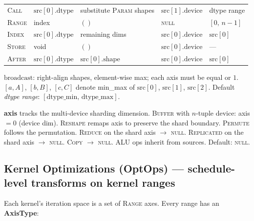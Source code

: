 \documentclass[10pt,letterpaper]{article}
\newcommand{\op}[1]{\textsc{#1}}
\begin{document}
\begin{tabular}{@{}l l l l l@{}}
\op{Call} & $\mathrm{src}[0].\mathrm{dtype}$ & substitute \op{Param} shapes & $\mathrm{src}[1].\mathrm{device}$ & dtype range \\
\op{Range} & index & $()$ & \textsc{null} & $[0,\, n{-}1]$ \\
\op{Index} & $\mathrm{src}[0].\mathrm{dtype}$ & remaining dims & $\mathrm{src}[0].\mathrm{device}$ & $\mathrm{src}[0]$ \\
\op{Store} & void & $()$ & $\mathrm{src}[0].\mathrm{device}$ & --- \\
\op{After} & $\mathrm{src}[0].\mathrm{dtype}$ & $\mathrm{src}[0].\mathrm{shape}$ & $\mathrm{src}[0].\mathrm{device}$ & $\mathrm{src}[0]$ \\
\bottomrule
\end{tabular}

\smallskip
$\mathrm{broadcast}$: right-align shapes, element-wise max; each axis must be equal or $1$.
$[a,A]$, $[b,B]$, $[c,C]$ denote min\_max of $\mathrm{src}[0]$, $\mathrm{src}[1]$, $\mathrm{src}[2]$.
Default \emph{dtype range}: $[\mathrm{dtype\_min},\, \mathrm{dtype\_max}]$.

\medskip
\textbf{axis} tracks the multi-device sharding dimension. \op{Buffer} with $n$-tuple device: axis $= 0$ (device dim).
\op{Reshape} remaps axis to preserve the shard boundary. \op{Permute} follows the permutation.
\op{Reduce} on the shard axis $\to$ \textsc{null}. \op{Replicated} on the shard axis $\to$ \textsc{null}. \op{Copy} $\to$ \textsc{null}. ALU ops inherit from sources. Default: \textsc{null}.

\subsection*{Kernel Optimizations (OptOps) \normalfont\small--- schedule-level transforms on kernel ranges}

Each kernel's iteration space is a set of \op{Range} axes. Every range has an \textbf{AxisType}:
\end{document}
